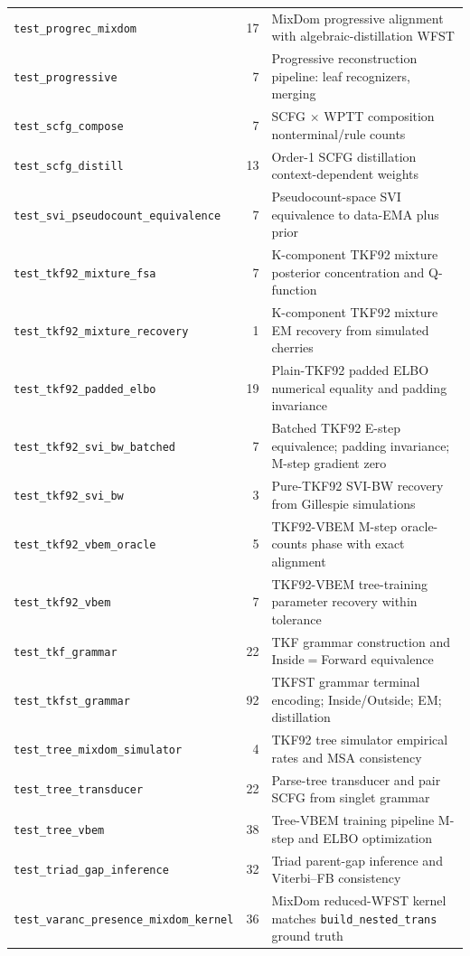 \begin{table}[htbp]
\begin{tabular}{@{}lrl@{}}
\texttt{test\_progrec\_mixdom} & 17 & MixDom progressive alignment with algebraic-distillation WFST \\
\texttt{test\_progressive} & 7 & Progressive reconstruction pipeline: leaf recognizers, merging \\
\texttt{test\_scfg\_compose} & 7 & SCFG $\times$ WPTT composition nonterminal/rule counts \\
\texttt{test\_scfg\_distill} & 13 & Order-1 SCFG distillation context-dependent weights \\
\texttt{test\_svi\_pseudocount\_equivalence} & 7 & Pseudocount-space SVI equivalence to data-EMA plus prior \\
\texttt{test\_tkf92\_mixture\_fsa} & 7 & K-component TKF92 mixture posterior concentration and Q-function \\
\texttt{test\_tkf92\_mixture\_recovery} & 1 & K-component TKF92 mixture EM recovery from simulated cherries \\
\texttt{test\_tkf92\_padded\_elbo} & 19 & Plain-TKF92 padded ELBO numerical equality and padding invariance \\
\texttt{test\_tkf92\_svi\_bw\_batched} & 7 & Batched TKF92 E-step equivalence; padding invariance; M-step gradient zero \\
\texttt{test\_tkf92\_svi\_bw} & 3 & Pure-TKF92 SVI-BW recovery from Gillespie simulations \\
\texttt{test\_tkf92\_vbem\_oracle} & 5 & TKF92-VBEM M-step oracle-counts phase with exact alignment \\
\texttt{test\_tkf92\_vbem} & 7 & TKF92-VBEM tree-training parameter recovery within tolerance \\
\texttt{test\_tkf\_grammar} & 22 & TKF grammar construction and Inside$=$Forward equivalence \\
\texttt{test\_tkfst\_grammar} & 92 & TKFST grammar terminal encoding; Inside/Outside; EM; distillation \\
\texttt{test\_tree\_mixdom\_simulator} & 4 & TKF92 tree simulator empirical rates and MSA consistency \\
\texttt{test\_tree\_transducer} & 22 & Parse-tree transducer and pair SCFG from singlet grammar \\
\texttt{test\_tree\_vbem} & 38 & Tree-VBEM training pipeline M-step and ELBO optimization \\
\texttt{test\_triad\_gap\_inference} & 32 & Triad parent-gap inference and Viterbi--FB consistency \\
\texttt{test\_varanc\_presence\_mixdom\_kernel} & 36 & MixDom reduced-WFST kernel matches \texttt{build\_nested\_trans} ground truth \\

\end{tabular}
\end{table}
